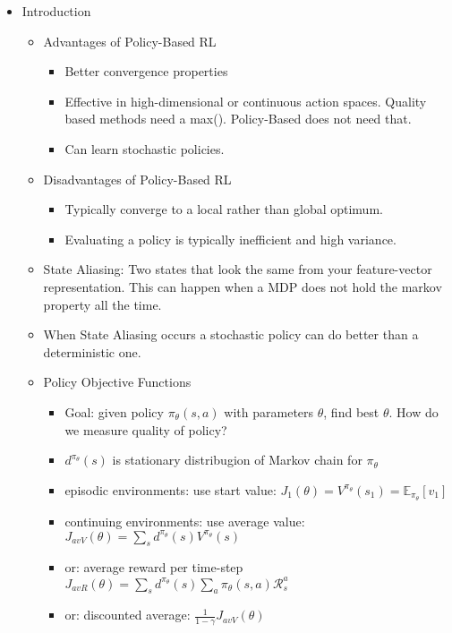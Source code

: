 \begin{itemize}[noitemsep,nolistsep]
	\item Introduction
	\begin{itemize}[noitemsep,nolistsep]
		\item Advantages of Policy-Based RL
		\begin{itemize}[noitemsep,nolistsep]
			\item Better convergence properties
			\item Effective in high-dimensional or continuous action spaces. Quality based methods need a max(). Policy-Based does not need that.
			\item Can learn stochastic policies. 
		\end{itemize}
		\item Disadvantages of Policy-Based RL
		\begin{itemize}[noitemsep,nolistsep]
			\item Typically converge to a local rather than global optimum.
			\item Evaluating a policy is typically inefficient and high variance.
		\end{itemize}
		\item State Aliasing: Two states that look the same from your feature-vector representation. This can happen when a MDP does not hold the markov property all the time.
		\item When State Aliasing occurs a stochastic policy can do better than a deterministic one.
		\item Policy Objective Functions
		\begin{itemize}[noitemsep,nolistsep]
			\item Goal: given policy $\pi_\theta (s,a)$ with parameters $\theta$, find best $\theta$. How do we measure quality of policy?
			\item $d^{\pi_\theta}(s)$ is stationary distribugion of Markov chain for $\pi_\theta$
			\item episodic environments: use start value: $J_1(\theta) = V^{\pi_\theta}(s_1) = \mathbb{E}_{\pi_\theta}[v_1]$
			\item continuing environments: use average value: $J_{avV}(\theta) = \sum_s d^{\pi_\theta}(s)V^{\pi_\theta}(s)$
			\item or: average reward per time-step $J_{avR}(\theta) = \sum_s d^{\pi_\theta}(s) \sum_a \pi_\theta(s,a)\mathcal{R}_s^a$
			\item or: discounted average: $\frac{1}{1-\gamma} J_{avV}(\theta)$
		\end{itemize}

\end{itemize}
\end{itemize}
